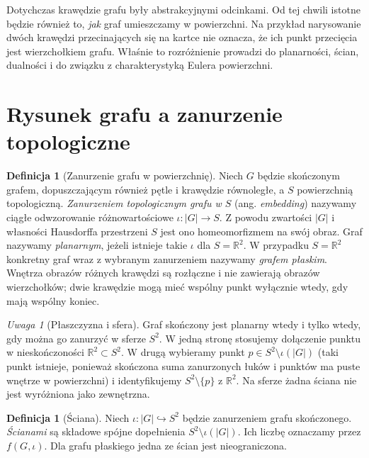 \documentclass[11pt,a4paper]{report}
\numberwithin{equation}{section}
\theoremstyle{plain}
\theoremstyle{definition}
\newtheorem{definicja}[twierdzenie]{Definicja}
\theoremstyle{remark}
\newtheorem{uwaga}[twierdzenie]{Uwaga}
\begin{document}
Dotychczas krawędzie grafu były abstrakcyjnymi odcinkami. Od tej chwili
istotne będzie również to, \emph{jak} graf umieszczamy w powierzchni.
Na przykład narysowanie dwóch krawędzi przecinających się na kartce
nie oznacza, że ich punkt przecięcia jest wierzchołkiem grafu.
Właśnie to rozróżnienie prowadzi do planarności, ścian, dualności
i do związku z charakterystyką Eulera powierzchni.

\section{Rysunek grafu a zanurzenie topologiczne}
\label{sec:tg-osadzanie-planarne}

\begin{definicja}[Zanurzenie grafu w powierzchnię]
Niech $G$ będzie skończonym grafem, dopuszczającym również pętle
i krawędzie równoległe, a $S$ powierzchnią topologiczną.
\emph{Zanurzeniem topologicznym grafu w $S$} (ang. \emph{embedding})
nazywamy ciągłe odwzorowanie różnowartościowe $\iota:|G|\to S$.
Z powodu zwartości $|G|$ i własności Hausdorffa przestrzeni $S$
jest ono homeomorfizmem na swój obraz. Graf nazywamy \emph{planarnym},
jeżeli istnieje takie $\iota$ dla $S=\mathbb R^2$.
W przypadku $S=\mathbb R^2$ konkretny graf wraz z wybranym
zanurzeniem nazywamy \emph{grafem płaskim}. Wnętrza obrazów różnych
krawędzi są rozłączne i nie zawierają obrazów wierzchołków;
dwie krawędzie mogą mieć wspólny punkt wyłącznie wtedy, gdy
mają wspólny koniec.
\end{definicja}

\begin{uwaga}[Płaszczyzna i sfera]
Graf skończony jest planarny wtedy i tylko wtedy, gdy można go
zanurzyć w sferze $S^2$. W jedną stronę stosujemy dołączenie
punktu w nieskończoności $\mathbb R^2\subset S^2$.
W drugą wybieramy punkt $p\in S^2\setminus\iota(|G|)$
(taki punkt istnieje, ponieważ skończona suma zanurzonych łuków
i punktów ma puste wnętrze w powierzchni)
i identyfikujemy $S^2\setminus\{p\}$ z $\mathbb R^2$.
Na sferze żadna ściana nie jest wyróżniona jako zewnętrzna.
\end{uwaga}

\begin{definicja}[Ściana]
Niech $\iota:|G|\hookrightarrow S^2$ będzie zanurzeniem grafu
skończonego. \emph{Ścianami} są składowe spójne dopełnienia
$S^2\setminus\iota(|G|)$. Ich liczbę oznaczamy przez $f(G,\iota)$.
Dla grafu płaskiego jedna ze ścian jest nieograniczona.
\end{definicja}
\end{document}
